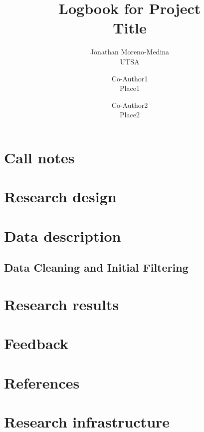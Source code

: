 \documentclass{report}
\title{Logbook for Project\\
  Title}
\author{
Jonathan Moreno-Medina \\ {UTSA} \and  
Co-Author1 \\ {Place1} \and
Co-Author2 \\ {Place2}
}
\date{}
\numberwithin{equation}{section}
\numberwithin{figure}{section}
\numberwithin{table}{section}
\begin{document}
\maketitle

\renewcommand{\thechapter}{\Alph{chapter}}
\setcounter{tocdepth}{1}
\tableofcontents
\etocsettocstyle{}{} %

\chapter{Call notes}
%
%

\chapter{Research design}

\chapter{Data description}

\section{Data Cleaning and Initial Filtering}\label{sec:data_clean} 
%

\chapter{Research results}

\chapter{Feedback}

\chapter{References}
\begin{singlespace}
    
\end{singlespace}

\chapter{Research infrastructure}

\end{document}
